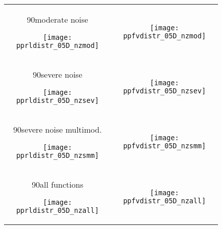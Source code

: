 \documentclass{article}
\newcommand{\Df}{\ensuremath{\Delta f}}
\newcommand{\fopt}{\ensuremath{f_\mathrm{opt}}}
\newcommand{\rot}[2][2.5]{
  \hspace*{-3.5\baselineskip}%
  \begin{rotate}{90}\hspace{#1em}#2
  \end{rotate}}
\begin{document}
\begin{figure}[htbp!]
\centering
\begin{tabular}{@{}c@{}c@{}}
\rot[2.]{moderate noise}
\texttt{[image: pprldistr\_05D\_nzmod]} &
\texttt{[image: ppfvdistr\_05D\_nzmod]}
\\[-1ex]
\rot[2.8]{severe noise}
\texttt{[image: pprldistr\_05D\_nzsev]} &
\texttt{[image: ppfvdistr\_05D\_nzsev]}
\\[-1ex]
\rot[0.6]{severe noise multimod.}
\texttt{[image: pprldistr\_05D\_nzsmm]} &
\texttt{[image: ppfvdistr\_05D\_nzsmm]}\\[-1ex]
\rot[2.8]{all functions}
\texttt{[image: pprldistr\_05D\_nzall]} & 
\texttt{[image: ppfvdistr\_05D\_nzall]}
\end{tabular}
\vspace*{-2ex}
\caption{\label{fig:RLDs05D\algfolder}%
%
}
\end{figure}
\end{document}
